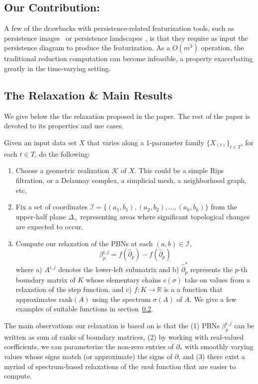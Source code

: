 \documentclass[10pt]{article}
\newcommand{\+}{%
	\raisebox{0.18ex}{\scaleobj{0.55}{+}}
}
\begin{document}
\subsection{Our Contribution:}
A few of the drawbacks with persistence-related featurization tools, such as persistence images~\cite{} or persistence landscapes~\cite{}, is that they require as input the persistence diagram to produce the featurization. As a $O(m^3)$ operation, the traditional reduction computation can become infeasible, a property exacerbating greatly in the time-varying setting. 

\subsection{The Relaxation \& Main Results}
We give below the the relaxation proposed in the paper. The rest of the paper is devoted to its properties and use cases. 

Given an input data set $X$ that varies along a 1-parameter family $\{X_{(t)}\}_{t \in T}$, for each $t \in T$, do the following:
\begin{enumerate}
	\item Choose a geometric realization $\mathcal{K}$ of $X$. This could be a simple Rips filtration, or a Delaunay complex, a simplicial mesh, a neighborhood graph, etc. 
	\item Fix a set of coordinates $\mathcal{I} = \{(a_1,b_1), (a_2,b_2), \dots, (a_k,b_k)\}$ from the upper-half plane $\Delta_+$ representing areas where significant topological changes are expected to occur. 
	\item Compute our relaxation of the PBNs at each $(a,b) \in \mathcal{I}$, 
	$$ \beta_{p}^{i,j} = f(\hat{\partial}_p) -  f(\hat{\partial}_p) $$
	where 
	a) $A^{i,j}$ denotes the lower-left submatrix and
	b) $\hat{\partial}_p^{\ast}$ represents the $p$-th boundary matrix of $K$ whose elementary chains $c(\sigma)$ take on values from a relaxation of the step function. 
	and c) $f: K \to \mathbb{R}$ is a a function that approximates $\mathrm{rank}(A)$ using the spectrum $\sigma(A)$ of $A$. 
	We give a few examples of suitable functions in section~\ref{}. 

\end{enumerate}

The main observations our relaxation is based on is that the (1) PBNs $\beta_p^{i,j}$ can be written as sum of ranks of boundary matrices, (2) by working with real-valued coefficients, we can parameterize the non-zero entries of $\partial_\ast$ with smoothly varying values whose signs match (or approximate) the signs of $\partial$, and (3) there exist a myriad of spectrum-based relaxations of the \emph{rank} function that are easier to compute. 
\end{document}
